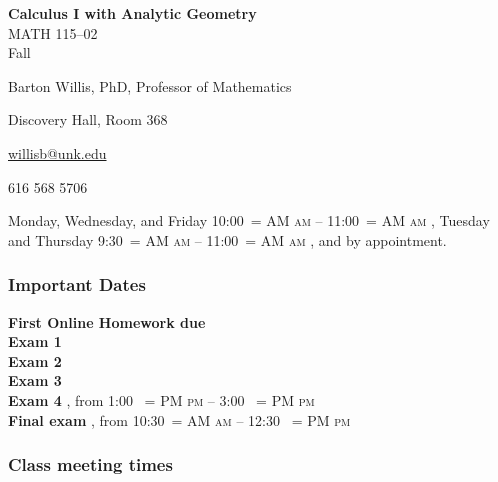 \documentclass[12pt]{article}
\makeatletter
\newcounter{ex}\setcounter{ex}{0}
\newenvironment{mypar}[2]
  {\begin{list}{}%
    {\setlength\leftmargin{#1}
    \setlength\rightmargin{#2}}
    \item[]}
  {\end{list}}
\renewenvironment{description}[0]{\begin{compactdesc}}{\end{compactdesc}}
\DeclareRobustCommand{\maybefakesc}[1]{%
  \ifnum\pdfstrcmp{\f@series}{\bfdefault}=\z@
    {\fontsize{\dimexpr0.8\dimexpr\f@size pt\relax}{0}\selectfont\uppercase{#1}}%
  \else
    \textsc{#1}%
  \fi
}
\newcommand\AM{\,\maybefakesc{am}\xspace}
\newcommand\PM{\,\maybefakesc{pm}\xspace}
\newcommand{\coursename}{Calculus I with Analytic Geometry}
\newcommand{\coursenumber}{MATH 115}
\newcommand{\sectionnumber}{02}
\newcommand{\term}{Fall }
\newcommand{\officehours}{ Monday, Wednesday, and Friday 10:00\AM{} -- 11:00\AM,
    Tuesday and Thursday 9:30\AM -- 11:00\AM, and by appointment.}
\newcommand{\finaldateandtime}{\printdate{15/12/\the\year},{} from 10:30\AM{} -- 12:30 \PM}
\makeatother
\begin{document}
\cleanlookdateon%
\shortdate
\printyearoff
\large
\begin{center}
    \textbf{\coursename}  \\
    {\coursenumber--\sectionnumber} \\
     {\term \the\year} \\
\end{center}

\vskip0.25in
\normalsize


\begin{center}
\begin{description}
    \item[Instructor:] Barton Willis, PhD, Professor of Mathematics
    \item[Office:]  Discovery Hall, Room 368
    \item[\phone:]   
    \item[\Email:]    \href{mailto:willisb@unk.edu}{willisb@unk.edu}
    \item[Zoom:] 616 568 5706
    \item[Office Hours:] \officehours
  \end{description}
\end{center}



\subsubsection*{Important Dates}

\begin{mypar}{0.25in}{0.25in} 

      \textbf{First Online Homework due} \dotfill  {}  \\
       \textbf{Exam 1} \dotfill {}  \\
    \textbf{Exam 2} \dotfill  {} \\
    \textbf{Exam 3} \dotfill {} \\
     \textbf{Exam 4} \dotfill {},{} from 1:00 \PM{} -- 3:00 \PM \\
      \textbf{Final exam} \dotfill  \finaldateandtime
\end{mypar}


\subsubsection*{Class meeting times}
\end{document}
